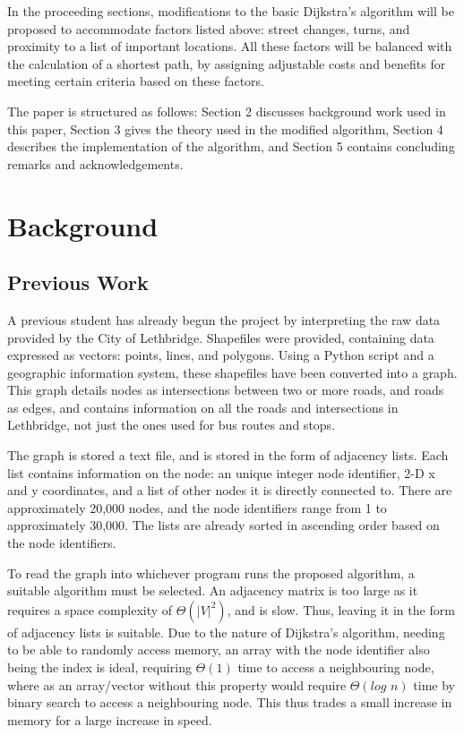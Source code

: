 \documentclass[letter,10pt]{article}
\begin{document}
In the proceeding sections, modifications to the basic Dijkstra's algorithm will be proposed to accommodate factors listed above: street changes, turns, and proximity to a list of important locations. All these factors will be balanced with the calculation of a shortest path, by assigning adjustable costs and benefits for meeting certain criteria based on these factors.

The paper is structured as follows: Section 2 discusses background work used in this paper, Section 3 gives the theory used in the modified algorithm, Section 4 describes the implementation of the algorithm, and Section 5 contains concluding remarks and acknowledgements. 

\newpage
\section{Background}
\subsection*{Previous Work}
A previous student has already begun the project by interpreting the raw data provided by the City of Lethbridge. Shapefiles were provided, containing data expressed as vectors: points, lines, and polygons. Using a Python script and a geographic information system, these shapefiles have been converted into a graph. This graph details nodes as intersections between two or more roads, and roads as edges, and contains information on all the roads and intersections in Lethbridge, not just the ones used for bus routes and stops.

The graph is stored a text file, and is stored in the form of adjacency lists. Each list contains information on the node: an unique integer node identifier, 2-D x and y coordinates, and a list of other nodes it is directly connected to. There are approximately 20,000 nodes, and the node identifiers range from 1 to approximately 30,000. The lists are already sorted in ascending order based on the node identifiers. 

To read the graph into whichever program runs the proposed algorithm, a suitable algorithm must be selected. An adjacency matrix is too large as it requires a space complexity of $\Theta (|V|^2)$, and is slow. Thus, leaving it in the form of adjacency lists is suitable. Due to the nature of Dijkstra's algorithm, needing to be able to randomly access memory, an array with the node identifier also being the index is ideal, requiring $\Theta (1)$ time to access a neighbouring node, where as an array/vector without this property would require $\Theta (log\,\, n)$ time by binary search to access a neighbouring node. This thus trades a small increase in memory for a large increase in speed.
\end{document}
